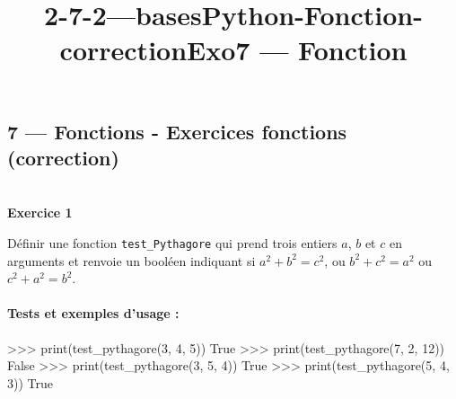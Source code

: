\documentclass[a4paper,17pt]{extarticle}
\title{2-7-2---basesPython-Fonction-correctionExo}
\newenvironment{eleve}%
{\begin{activite}\color{noiramu}\\[-0.5cm]}
{\end{activite}}
\newenvironment{Shaded}{}{}
\newcommand{\DecValTok}[1]{\textcolor[rgb]{0.25,0.63,0.44}{{#1}}}
\newcommand{\NormalTok}[1]{{#1}}
\newcommand{\VariableTok}[1]{\textcolor[rgb]{0.10,0.09,0.49}{{#1}}}
\newcommand{\OperatorTok}[1]{\textcolor[rgb]{0.40,0.40,0.40}{{#1}}}
\newcommand{\BuiltInTok}[1]{{#1}}
\begin{document}
    
    \title{7 --- Fonction}

    
    

    
    \hypertarget{fonctions---exercices-fonctions-correction}{%
\subsection{7 --- Fonctions - Exercices fonctions
(correction)}\label{fonctions---exercices-fonctions-correction}}
\begin{eleve}
    \textbf{Exercice 1}

Définir une fonction \texttt{test\_Pythagore} qui prend trois entiers
\(a\), \(b\) et \(c\) en arguments et renvoie un booléen indiquant si
\(a^2 + b^2 = c^2\), ou \(b^2 + c^2 = a^2\) ou \(c^2 + a^2 = b^2\).

\hypertarget{tests-et-exemples-dusage}{%
\paragraph{Tests et exemples d'usage :}\label{tests-et-exemples-dusage}}

\begin{Shaded}
\begin{Highlighting}[]
\OperatorTok{\textgreater{}\textgreater{}\textgreater{}} \BuiltInTok{print}\NormalTok{(test\_pythagore(}\DecValTok{3}\NormalTok{, }\DecValTok{4}\NormalTok{, }\DecValTok{5}\NormalTok{))}
\VariableTok{True}
\OperatorTok{\textgreater{}\textgreater{}\textgreater{}} \BuiltInTok{print}\NormalTok{(test\_pythagore(}\DecValTok{7}\NormalTok{, }\DecValTok{2}\NormalTok{, }\DecValTok{12}\NormalTok{))}
\VariableTok{False}
\OperatorTok{\textgreater{}\textgreater{}\textgreater{}} \BuiltInTok{print}\NormalTok{(test\_pythagore(}\DecValTok{3}\NormalTok{, }\DecValTok{5}\NormalTok{, }\DecValTok{4}\NormalTok{))}
\VariableTok{True}
\OperatorTok{\textgreater{}\textgreater{}\textgreater{}} \BuiltInTok{print}\NormalTok{(test\_pythagore(}\DecValTok{5}\NormalTok{, }\DecValTok{4}\NormalTok{, }\DecValTok{3}\NormalTok{))}
\VariableTok{True}
\end{Highlighting}
\end{Shaded}
        
        \end{eleve}
\end{document}
